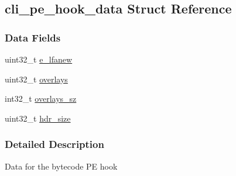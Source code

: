 \hypertarget{structcli__pe__hook__data}{
\subsection{cli\_\-pe\_\-hook\_\-data Struct Reference}
\label{structcli__pe__hook__data}
}
\subsubsection*{Data Fields}
\begin{DoxyCompactItemize}
\item 
uint32\_\-t \hyperlink{structcli__pe__hook__data_a3d0539adcc53a30b31c2a18bc8b84e00}{e\_\-lfanew}
\item 
uint32\_\-t \hyperlink{structcli__pe__hook__data_af169b0060e4ed3e78fd7ef2588aa7ef6}{overlays}
\item 
int32\_\-t \hyperlink{structcli__pe__hook__data_aed2bc0e93b8e8e291987fc1a2ef801d1}{overlays\_\-sz}
\item 
uint32\_\-t \hyperlink{structcli__pe__hook__data_af2492dd421362ffced98eb583964b310}{hdr\_\-size}
\end{DoxyCompactItemize}


\subsubsection{Detailed Description}
Data for the bytecode PE hook 


